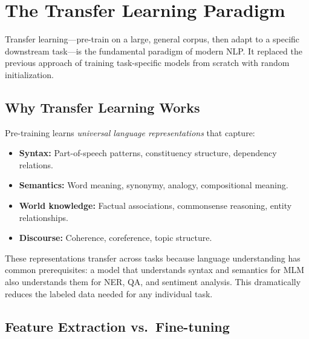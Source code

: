 \section{The Transfer Learning Paradigm}
\label{sec:transfer-learning}

Transfer learning---pre-train on a large, general corpus, then adapt to a
specific downstream task---is the fundamental paradigm of modern NLP.  It
replaced the previous approach of training task-specific models from scratch
with random initialization.

\subsection{Why Transfer Learning Works}

Pre-training learns \emph{universal language representations} that capture:
\begin{itemize}
    \item \textbf{Syntax:} Part-of-speech patterns, constituency structure,
          dependency relations.
    \item \textbf{Semantics:} Word meaning, synonymy, analogy, compositional
          meaning.
    \item \textbf{World knowledge:} Factual associations, commonsense reasoning,
          entity relationships.
    \item \textbf{Discourse:} Coherence, coreference, topic structure.
\end{itemize}

These representations transfer across tasks because language understanding has
common prerequisites: a model that understands syntax and semantics for MLM
also understands them for NER, QA, and sentiment analysis.  This dramatically
reduces the labeled data needed for any individual task.

\subsection{Feature Extraction vs.\ Fine-tuning}

